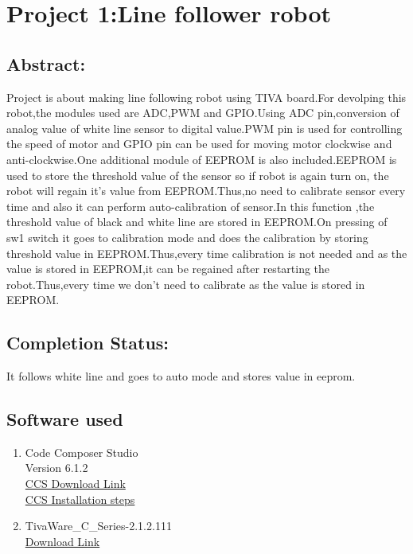 \documentclass[a4paper,12pt,oneside]{book}
\begin{document}


\newpage
\chapter{Project 1:Line follower robot}
\section*{Abstract:}

Project is about making line following robot using TIVA board.For devolping this robot,the modules used are ADC,PWM and GPIO.Using ADC pin,conversion of analog value of white line sensor to digital value.PWM pin is used for controlling the speed of motor and GPIO pin can be used for moving motor clockwise and anti-clockwise.One additional module of EEPROM is also included.EEPROM is used to store the threshold value of the sensor so if robot is again turn on, the robot  will regain it's value from EEPROM.Thus,no need to calibrate sensor every time and also it can perform auto-calibration of sensor.In this function ,the threshold value of black and white line are stored in EEPROM.On pressing of sw1 switch it goes to calibration mode and does the calibration by storing threshold value in EEPROM.Thus,every time calibration is not needed and as the value is stored in EEPROM,it can be regained after restarting the robot.Thus,every time we don't need to calibrate as the value is stored in EEPROM.   

\section*{Completion Status:}
It follows white line and goes to auto mode and stores value in eeprom.
\section{Software used}
\begin{enumerate}
  \item Code Composer Studio\\  
  Version 6.1.2 \\
  \href{http://processors.wiki.ti.com/index.php/Download_CCS}{CCS Download Link}\\
  \href{http://processors.wiki.ti.com/index.php/GSG:CCSv6_installation}{CCS Installation steps}
  \item TivaWare\_C\_Series-2.1.2.111\\
  \href{http://www.ti.com/tool/sw-tm4c}{Download Link}
\end{enumerate}
\end{document}
